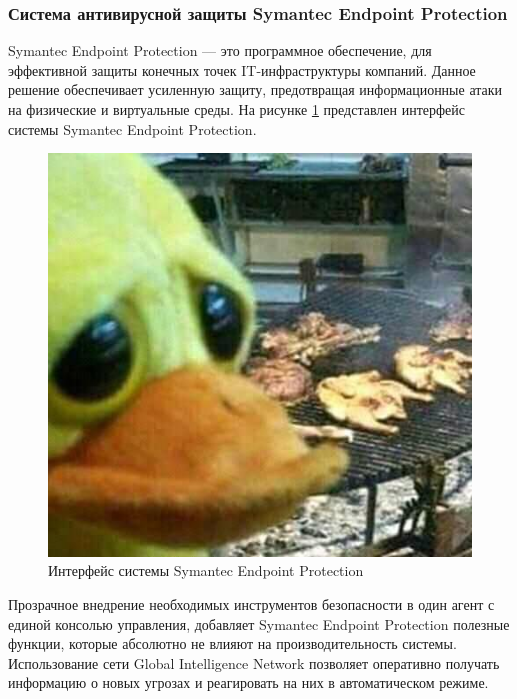 \subsubsection{Система антивирусной защиты Symantec Endpoint Protection}
Symantec Endpoint Protection — это программное обеспечение, для эффективной защиты конечных точек IT-инфраструктуры компаний. Данное решение обеспечивает усиленную защиту, предотвращая информационные атаки на физические и виртуальные среды. На рисунке \ref{Symantec} представлен интерфейс системы Symantec Endpoint Protection.

\begin{figure}[H]
  \centering
  \includegraphics[width=1\textwidth]{image/3.jpg}
  \caption{Интерфейс системы Symantec Endpoint Protection}
  \label{Symantec}
\end{figure}

Прозрачное внедрение необходимых инструментов безопасности в один агент с единой консолью управления, добавляет Symantec Endpoint Protection полезные функции, которые абсолютно не влияют на производительность системы. Использование сети Global Intelligence Network позволяет оперативно получать информацию о новых угрозах и реагировать на них в автоматическом режиме.

